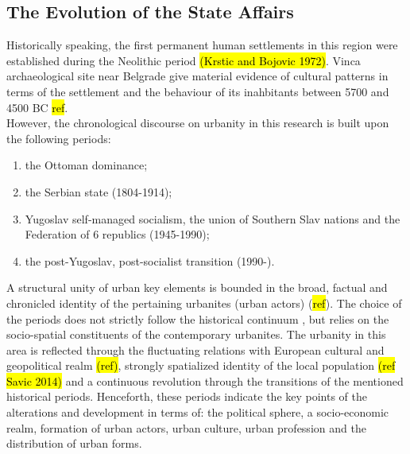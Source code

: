 \documentclass[11pt]{report}
\begin{document}
\subsection{The Evolution of the State Affairs}

Historically speaking, the first permanent human settlements in this region were established during the  Neolithic  period \hl{(Krstic and Bojovic 1972)}. Vinca archaeological site near Belgrade give material evidence of cultural patterns in terms of the settlement and the behaviour of its inahbitants between 5700 and 4500 BC \hl{ref}.
\\
However, the chronological discourse on urbanity in this research is built upon the following periods:
\begin{enumerate}
\item the Ottoman dominance;
\item the Serbian state (1804-1914);\footnotemark 
\item Yugoslav self-managed socialism, the union of Southern Slav nations and the Federation of 6 republics (1945-1990);
\item the post-Yugoslav, post-socialist transition (1990-).
\end{enumerate}

A structural unity of urban key elements is bounded in the broad, factual and chronicled identity of the pertaining urbanites (urban actors) (\hl{ref}).
The choice of the periods does not strictly follow the historical continuum \footnotemark, but relies on the socio-spatial constituents of the contemporary urbanites. The urbanity in this area is reflected through the fluctuating relations with European cultural and geopolitical realm \hl{(ref)}, strongly spatialized identity of the local population \hl{(ref Savic 2014)} and a continuous revolution through the transitions of the mentioned historical periods. Henceforth, these periods indicate the key points of the alterations and development in terms of: the political sphere, a socio-economic realm, formation of urban actors, urban culture, urban profession and the distribution of urban forms.
\end{document}
